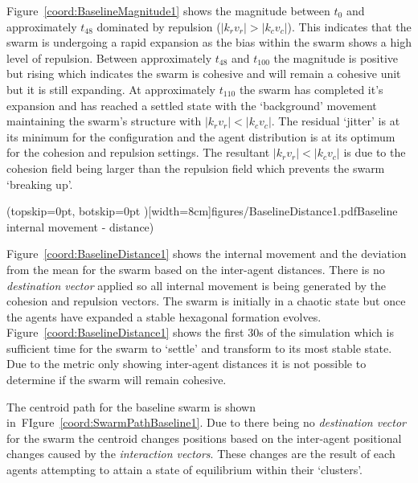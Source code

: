 \documentclass{ieeeaccess}
\begin{document}
Figure~\ref{coord:BaselineMagnitude1} shows the magnitude between $t_0$ and approximately $t_{48}$ dominated by repulsion ($|k_rv_r| > |k_cv_c|$). This indicates that the swarm is undergoing a rapid expansion as the bias within the swarm shows a high level of repulsion. Between approximately $t_{48}$ and $t_{100}$ the magnitude is positive but rising which indicates the swarm is cohesive and will remain a cohesive unit but it is still expanding. At approximately $t_{110}$ the swarm has completed it's expansion and has reached a settled state with the `background' movement maintaining the swarm's structure with $|k_rv_r| < |k_cv_c|$. The residual `jitter' is at its minimum for the configuration and the agent distribution is at its optimum for the cohesion and repulsion settings. The resultant $|k_rv_r| < |k_cv_c|$ is due to the cohesion field being larger than the repulsion field which prevents the swarm `breaking up'. 


\Figure[t!](topskip=0pt, botskip=0pt )[width=8cm]{figures/BaselineDistance1.pdf}{Baseline internal movement - distance)\label{coord:BaselineDistance1}}

Figure~\ref{coord:BaselineDistance1} shows the internal movement and the deviation from the mean for the swarm based on the inter-agent distances. There is no \textit{destination vector} applied so all internal movement is being generated by the cohesion and repulsion vectors. The swarm is initially in a chaotic state but once the agents have expanded a stable hexagonal formation evolves. Figure~\ref{coord:BaselineDistance1} shows the first 30s of the simulation which is sufficient time for the swarm to `settle' and transform to its most stable state. Due to the metric only showing inter-agent distances it is not possible to determine if the swarm will remain cohesive.

The centroid path for the baseline swarm is shown in~FIgure~\ref{coord:SwarmPathBaseline1}. Due to there being no \textit{destination vector} for the swarm the centroid changes positions based on the inter-agent positional changes caused by the \textit{interaction vectors}. These changes are the result of each agents attempting to attain a state of equilibrium within their `clusters'.
\end{document}
